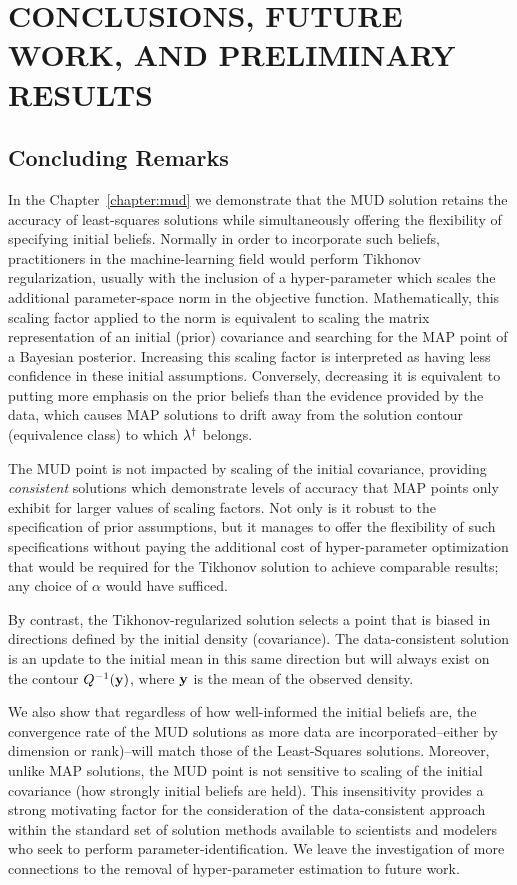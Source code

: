 \chapter{\uppercase{Conclusions, Future Work, and Preliminary Results} \label{chapter:future}}


\section{Concluding Remarks}
In the Chapter~\ref{chapter:mud} we demonstrate that the MUD solution retains the accuracy of least-squares solutions while simultaneously offering the flexibility of specifying initial beliefs.
Normally in order to incorporate such beliefs, practitioners in the machine-learning field would perform Tikhonov regularization, usually with the inclusion of a hyper-parameter which scales the additional parameter-space norm in the objective function.
Mathematically, this scaling factor applied to the norm is equivalent to scaling the matrix representation of an initial (prior) covariance and searching for the MAP point of a Bayesian posterior.
Increasing this scaling factor is interpreted as having less confidence in these initial assumptions.
Conversely, decreasing it is equivalent to putting more emphasis on the prior beliefs than the evidence provided by the data, which causes MAP solutions to drift away from the solution contour (equivalence class) to which $\lambda^\dagger$ belongs.

The MUD point is not impacted by scaling of the initial covariance, providing \emph{consistent} solutions which demonstrate levels of accuracy that MAP points only exhibit for larger values of scaling factors.
Not only is it robust to the specification of prior assumptions, but it manages to offer the flexibility of such specifications without paying the additional cost of hyper-parameter optimization that would be required for the Tikhonov solution to achieve comparable results; any choice of $\alpha$ would have sufficed.

By contrast, the Tikhonov-regularized solution selects a point that is biased in directions defined by the initial density (covariance).
The data-consistent solution is an update to the initial mean in this same direction but will always exist on the contour $Q^{-1}(\mathbf{y})$, where $\mathbf{y}$ is the mean of the observed density.


We also show that regardless of how well-informed the initial beliefs are, the convergence rate of the MUD solutions as more data are incorporated\---either by dimension or rank)\---will match those of the Least-Squares solutions.
Moreover, unlike MAP solutions, the MUD point is not sensitive to scaling of the initial covariance (how strongly initial beliefs are held).
This insensitivity provides a strong motivating factor for the consideration of the data-consistent approach within the standard set of solution methods available to scientists and modelers who seek to perform parameter-identification.
We leave the investigation of more connections to the removal of hyper-parameter estimation to future work.

